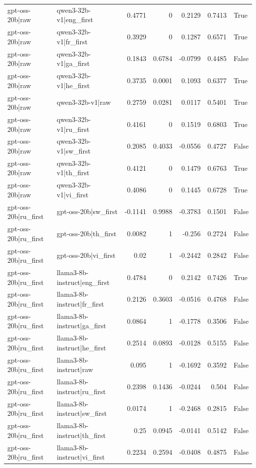 \begin{table}
\begin{tabular}{l l r r r r l}
gpt-oss-20b|raw & qwen3-32b-v1|eng_first & 0.4771 & 0 & 0.2129 & 0.7413 & True \\
gpt-oss-20b|raw & qwen3-32b-v1|fr_first & 0.3929 & 0 & 0.1287 & 0.6571 & True \\
gpt-oss-20b|raw & qwen3-32b-v1|ga_first & 0.1843 & 0.6784 & -0.0799 & 0.4485 & False \\
gpt-oss-20b|raw & qwen3-32b-v1|he_first & 0.3735 & 0.0001 & 0.1093 & 0.6377 & True \\
gpt-oss-20b|raw & qwen3-32b-v1|raw & 0.2759 & 0.0281 & 0.0117 & 0.5401 & True \\
gpt-oss-20b|raw & qwen3-32b-v1|ru_first & 0.4161 & 0 & 0.1519 & 0.6803 & True \\
gpt-oss-20b|raw & qwen3-32b-v1|sw_first & 0.2085 & 0.4033 & -0.0556 & 0.4727 & False \\
gpt-oss-20b|raw & qwen3-32b-v1|th_first & 0.4121 & 0 & 0.1479 & 0.6763 & True \\
gpt-oss-20b|raw & qwen3-32b-v1|vi_first & 0.4086 & 0 & 0.1445 & 0.6728 & True \\
gpt-oss-20b|ru_first & gpt-oss-20b|sw_first & -0.1141 & 0.9988 & -0.3783 & 0.1501 & False \\
gpt-oss-20b|ru_first & gpt-oss-20b|th_first & 0.0082 & 1 & -0.256 & 0.2724 & False \\
gpt-oss-20b|ru_first & gpt-oss-20b|vi_first & 0.02 & 1 & -0.2442 & 0.2842 & False \\
gpt-oss-20b|ru_first & llama3-8b-instruct|eng_first & 0.4784 & 0 & 0.2142 & 0.7426 & True \\
gpt-oss-20b|ru_first & llama3-8b-instruct|fr_first & 0.2126 & 0.3603 & -0.0516 & 0.4768 & False \\
gpt-oss-20b|ru_first & llama3-8b-instruct|ga_first & 0.0864 & 1 & -0.1778 & 0.3506 & False \\
gpt-oss-20b|ru_first & llama3-8b-instruct|he_first & 0.2514 & 0.0893 & -0.0128 & 0.5155 & False \\
gpt-oss-20b|ru_first & llama3-8b-instruct|raw & 0.095 & 1 & -0.1692 & 0.3592 & False \\
gpt-oss-20b|ru_first & llama3-8b-instruct|ru_first & 0.2398 & 0.1436 & -0.0244 & 0.504 & False \\
gpt-oss-20b|ru_first & llama3-8b-instruct|sw_first & 0.0174 & 1 & -0.2468 & 0.2815 & False \\
gpt-oss-20b|ru_first & llama3-8b-instruct|th_first & 0.25 & 0.0945 & -0.0141 & 0.5142 & False \\
gpt-oss-20b|ru_first & llama3-8b-instruct|vi_first & 0.2234 & 0.2594 & -0.0408 & 0.4875 & False \\

\end{tabular}
\end{table}
